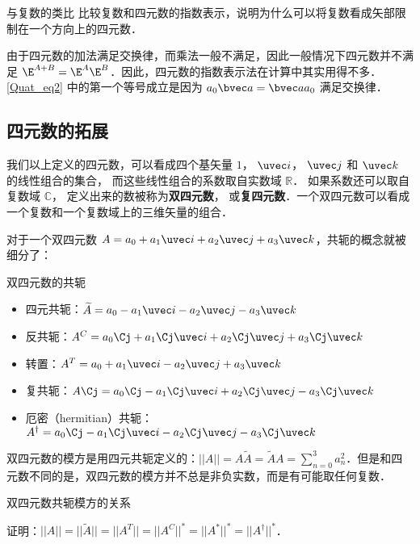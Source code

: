 \begin{exercise}{与复数的类比}
比较复数和四元数的指数表示，说明为什么可以将复数看成矢部限制在一个方向上的四元数．
\end{exercise}

由于四元数的加法满足交换律，而乘法一般不满足，因此一般情况下四元数并不满足 $\E^{A+B} = \E^A \E^B$．因此，四元数的指数表示法在计算中其实用得不多． \autoref{Quat_eq2} 中的第一个等号成立是因为 $a_0\bvec a = \bvec a a_0$ 满足交换律．

\subsection{四元数的拓展}

我们以上定义的四元数，可以看成四个基矢量 $1$， $\uvec i$， $\uvec j$ 和 $\uvec k$ 的线性组合的集合， 而这些线性组合的系数取自实数域 $\mathbb R$． 如果系数还可以取自复数域 $\mathbb C$， 定义出来的数被称为\textbf{双四元数}， 或\textbf{复四元数}．一个双四元数可以看成一个复数和一个复数域上的三维矢量的组合．

对于一个双四元数 $A=a_0+a_1 \uvec i+a_2\uvec j+a_3\uvec k$，共轭的概念就被细分了：

\begin{definition}{双四元数的共轭}
\begin{itemize}
\item 四元共轭：$\widetilde{A}=a_0-a_1\uvec i-a_2\uvec j-a_3\uvec k$
\item 反共轭：$A^C=a_0\Cj + a_1\Cj\uvec i+a_2\Cj\uvec j+a_3\Cj\uvec k$
\item 转置：$A^T=a_0+a_1\uvec i-a_2\uvec j+a_3\uvec k$
\item 复共轭：$A\Cj=a_0\Cj-a_1\Cj\uvec i+a_2\Cj\uvec j-a_3\Cj\uvec k$
\item 厄密（hermitian）共轭：$A^\dagger=a_0\Cj-a_1\Cj\uvec i-a_2\Cj\uvec j-a_3\Cj\uvec k$
\end{itemize}
\end{definition}

双四元数的模方是用四元共轭定义的：$||A||=A\widetilde{A}=\widetilde{A}A=\sum^{3}_{n=0}a^2_n$．但是和四元数不同的是，双四元数的模方并不总是非负实数，而是有可能取任何复数．

\begin{exercise}{双四元数共轭模方的关系}

证明：$||A||=||\widetilde{A}||=||A^T||=||A^C||^*=||A^*||^*=||A^\dagger||^*$．

\end{exercise}


